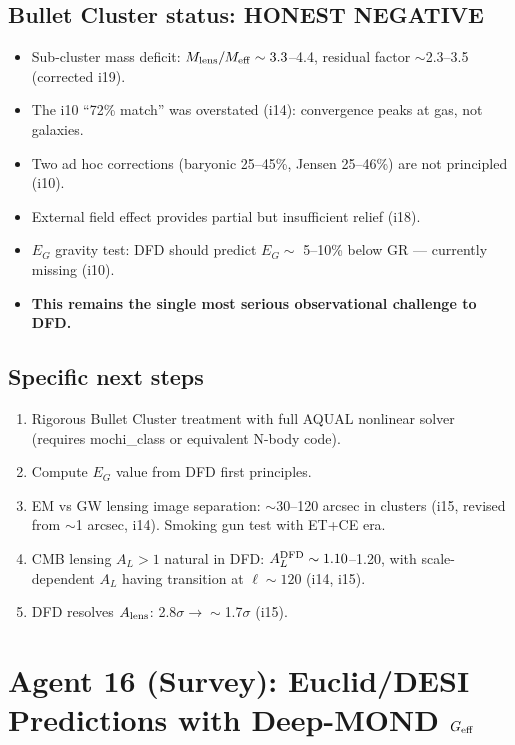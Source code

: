 \documentclass[11pt]{article}
\begin{document}
\subsection{Bullet Cluster status: HONEST NEGATIVE}

\begin{itemize}
\item Sub-cluster mass deficit: $M_{\rm lens}/M_{\rm eff} \sim 3.3$--4.4, residual
factor $\sim$2.3--3.5 (corrected i19).
\item The i10 ``72\% match'' was overstated (i14): convergence peaks at gas, not galaxies.
\item Two ad hoc corrections (baryonic 25--45\%, Jensen 25--46\%) are not principled (i10).
\item External field effect provides partial but insufficient relief (i18).
\item $E_G$ gravity test: DFD should predict $E_G \sim$ 5--10\% below GR --- currently
missing (i10).
\item \textbf{This remains the single most serious observational challenge to DFD.}
\end{itemize}

\subsection{Specific next steps}
\begin{enumerate}
\item Rigorous Bullet Cluster treatment with full AQUAL nonlinear solver (requires
mochi\_class or equivalent N-body code).
\item Compute $E_G$ value from DFD first principles.
\item EM vs GW lensing image separation: $\sim$30--120 arcsec in clusters (i15, revised
from $\sim$1 arcsec, i14). Smoking gun test with ET+CE era.
\item CMB lensing $A_L > 1$ natural in DFD: $A_L^{\rm DFD} \sim 1.10$--1.20, with
scale-dependent $A_L$ having transition at $\ell \sim 120$ (i14, i15).
\item DFD resolves $A_{\rm lens}$: 2.8$\sigma \to \sim$1.7$\sigma$ (i15).
\end{enumerate}

\newpage
\section{Agent 16 (Survey): Euclid/DESI Predictions with Deep-MOND $G_{\rm eff}$}
\label{sec:agent16}
\end{document}
